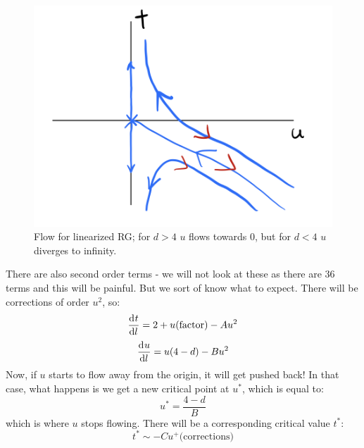 \begin{figure}[htbp]
    \centering
    \includegraphics[scale=0.4]{Lectures/Figures/rgflow-linear.png}
    \caption{Flow for linearized RG; for $d > 4$ $u$ flows towards $0$, but for $d < 4$ $u$ diverges to infinity.}
    \label{rgflow-linear}
\end{figure}

There are also second order terms - we will not look at these as there are 36 terms and this will be painful. But we sort of know what to expect. There will be corrections of order $u^2$, so:
\begin{equation}
    \dod{t}{l} = 2 + u(\text{factor}) - Au^2
\end{equation}
\begin{equation}
    \dod{u}{l} = u(4-d) - Bu^2
\end{equation}
Now, if $u$ starts to flow away from the origin, it will get pushed back! In that case, what happens is we get a new critical point at $u^*$, which is equal to:
\begin{equation}
    u^* = \frac{4-d}{B}
\end{equation}
which is where $u$ stops flowing. There will be a corresponding critical value $t^*$:
\begin{equation}
    t^* \sim -Cu^ + \text{(corrections)}
\end{equation}

